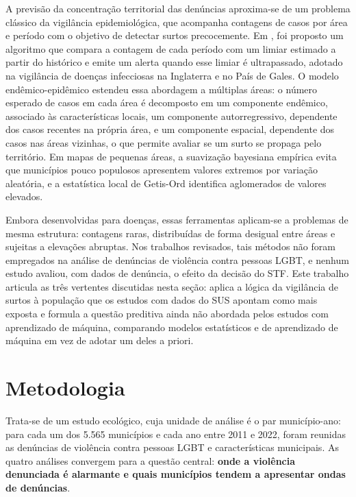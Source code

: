 \documentclass[12pt]{article}
\begin{document}
A previsão da concentração territorial das denúncias aproxima-se de um problema clássico da vigilância epidemiológica, que acompanha contagens de casos por área e período com o objetivo de detectar surtos precocemente. Em \cite{farrington:1996}, foi proposto um algoritmo que compara a contagem de cada período com um limiar estimado a partir do histórico e emite um alerta quando esse limiar é ultrapassado, adotado na vigilância de doenças infecciosas na Inglaterra e no País de Gales. O modelo endêmico-epidêmico \cite{held_hohle_hofmann:2005} estendeu essa abordagem a múltiplas áreas: o número esperado de casos em cada área é decomposto em um componente endêmico, associado às características locais, um componente autorregressivo, dependente dos casos recentes na própria área, e um componente espacial, dependente dos casos nas áreas vizinhas, o que permite avaliar se um surto se propaga pelo território. Em mapas de pequenas áreas, a suavização bayesiana empírica \cite{marshall:1991} evita que municípios pouco populosos apresentem valores extremos por variação aleatória, e a estatística local de Getis-Ord \cite{getis_ord:1992} identifica aglomerados de valores elevados.

Embora desenvolvidas para doenças, essas ferramentas aplicam-se a problemas de mesma estrutura: contagens raras, distribuídas de forma desigual entre áreas e sujeitas a elevações abruptas. Nos trabalhos revisados, tais métodos não foram empregados na análise de denúncias de violência contra pessoas LGBT, e nenhum estudo avaliou, com dados de denúncia, o efeito da decisão do STF. Este trabalho articula as três vertentes discutidas nesta seção: aplica a lógica da vigilância de surtos à população que os estudos com dados do SUS apontam como mais exposta e formula a questão preditiva ainda não abordada pelos estudos com aprendizado de máquina, comparando modelos estatísticos e de aprendizado de máquina em vez de adotar um deles a priori.


\clearpage
\section{Metodologia}
\label{sec:metodologia}

Trata-se de um estudo ecológico, cuja unidade de análise é o par município-ano: para cada um dos 5.565 municípios e cada ano entre 2011 e 2022, foram reunidas as denúncias de violência contra pessoas LGBT e características municipais. As quatro análises convergem para a questão central: \textbf{onde a violência denunciada é alarmante e quais municípios tendem a apresentar ondas de denúncias}.
\end{document}
